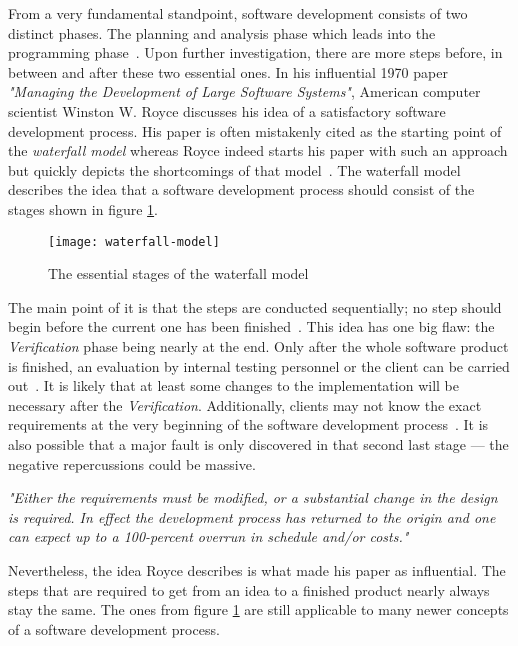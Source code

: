 \documentclass[12pt,a4paper,twoside]{report}
\begin{document}
From a very fundamental standpoint, software development consists of two distinct phases.
The planning and analysis phase which leads into the programming phase~\cite{royce-large-systems}.
Upon further investigation, there are more steps before, in between and after these two essential ones.
In his influential 1970 paper \textit{"Managing the Development of Large Software Systems"},
American computer scientist Winston W. Royce discusses his idea of a satisfactory
software development process. His paper is often mistakenly cited as the starting point
of the \textit{waterfall model} whereas Royce indeed starts his paper with such an approach but quickly
depicts the shortcomings of that model~\cite{royce-large-systems, larman-iid-history}.
The waterfall model describes the idea that a software development process should consist of
the stages shown in figure \ref{fig:waterfall-model}.
\begin{figure}[htbp]
\centering
\texttt{[image: waterfall-model]}
\caption{The essential stages of the waterfall model}
\label{fig:waterfall-model}
\end{figure}
The main point of it is that the steps are conducted sequentially;
no step should begin before the current one has been finished~\cite{boehm-spiral}.
This idea has one big flaw: the \textit{Verification} phase being nearly at the end.
Only after the whole software product is finished, an evaluation by
internal testing personnel or the client can be carried out~\cite{royce-large-systems}.
It is likely that at least some changes to the implementation will be necessary after the \textit{Verification}.
Additionally, clients may not know the exact requirements at the very beginning
of the software development process~\cite{parnas-rational-design-process}.
It is also possible that a major fault is only discovered in that second last stage ---
the negative repercussions could be massive.
\begin{displayquote}
\emph{"Either the requirements must be modified, or a substantial change
in the design is required. In effect the development process has returned to
the origin and one can expect up to a 100-percent overrun
in schedule and/or costs."}~\cite{royce-large-systems}
\end{displayquote}
Nevertheless, the idea Royce describes is what made his paper as influential.
The steps that are required to get from an idea to a finished product nearly always
stay the same. The ones from figure \ref{fig:waterfall-model} are still applicable to
many newer concepts of a software development process.
\end{document}
